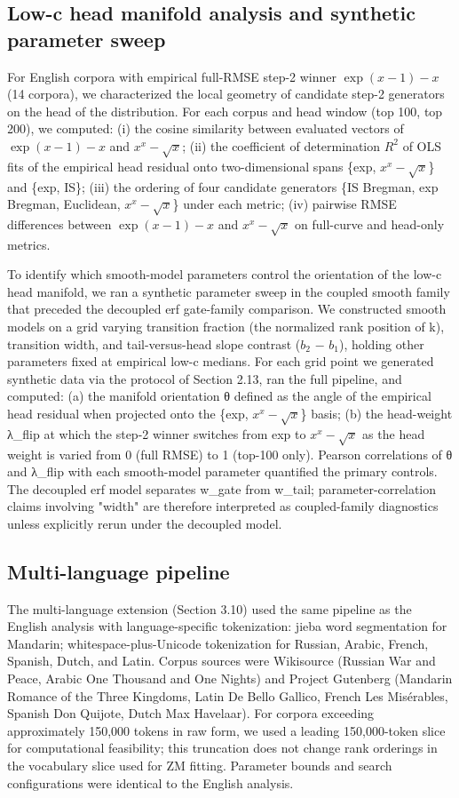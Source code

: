 \documentclass[11pt]{article}
\begin{document}
\subsection{Low-c head manifold analysis and synthetic parameter sweep}

For English corpora with empirical full-RMSE step-2 winner $\exp(x-1)-x$ (14 corpora), we characterized the local geometry of candidate step-2 generators on the head of the distribution. For each corpus and head window (top 100, top 200), we computed: (i) the cosine similarity between evaluated vectors of $\exp(x-1)-x$ and $x^x-\sqrt{x}$; (ii) the coefficient of determination $R^2$ of OLS fits of the empirical head residual onto two-dimensional spans \{exp, $x^x-\sqrt{x}$\} and \{exp, IS\}; (iii) the ordering of four candidate generators \{IS Bregman, exp Bregman, Euclidean, $x^x-\sqrt{x}$\} under each metric; (iv) pairwise RMSE differences between $\exp(x-1)-x$ and $x^x-\sqrt{x}$ on full-curve and head-only metrics.

To identify which smooth-model parameters control the orientation of the low-c head manifold, we ran a synthetic parameter sweep in the coupled smooth family that preceded the decoupled erf gate-family comparison. We constructed smooth models on a grid varying transition fraction (the normalized rank position of k), transition width, and tail-versus-head slope contrast ($b_2$ − $b_1$), holding other parameters fixed at empirical low-c medians. For each grid point we generated synthetic data via the protocol of Section 2.13, ran the full pipeline, and computed: (a) the manifold orientation θ defined as the angle of the empirical head residual when projected onto the \{exp, $x^x-\sqrt{x}$\} basis; (b) the head-weight λ\_flip at which the step-2 winner switches from exp to $x^x-\sqrt{x}$ as the head weight is varied from 0 (full RMSE) to 1 (top-100 only). Pearson correlations of θ and λ\_flip with each smooth-model parameter quantified the primary controls. The decoupled erf model separates w\_gate from w\_tail; parameter-correlation claims involving "width" are therefore interpreted as coupled-family diagnostics unless explicitly rerun under the decoupled model.

\subsection{Multi-language pipeline}

The multi-language extension (Section 3.10) used the same pipeline as the English analysis with language-specific tokenization: jieba word segmentation for Mandarin; whitespace-plus-Unicode tokenization for Russian, Arabic, French, Spanish, Dutch, and Latin. Corpus sources were Wikisource (Russian War and Peace, Arabic One Thousand and One Nights) and Project Gutenberg (Mandarin Romance of the Three Kingdoms, Latin De Bello Gallico, French Les Misérables, Spanish Don Quijote, Dutch Max Havelaar). For corpora exceeding approximately 150,000 tokens in raw form, we used a leading 150,000-token slice for computational feasibility; this truncation does not change rank orderings in the vocabulary slice used for ZM fitting. Parameter bounds and search configurations were identical to the English analysis.
\end{document}
